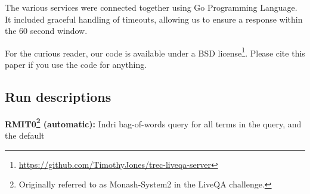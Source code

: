 \documentclass[a4paper,10pt,conference,compsocconf,final]{IEEEtran}
\begin{document}
The various services were connected together using Go Programming Language. It included graceful handling of timeouts, allowing us to ensure
a response within the 60 second window. 

For the curious reader, our code is
available under a BSD license\footnote{\url{https://github.com/TimothyJones/trec-liveqa-server}}. Please cite this paper if you use the code for anything.

\subsection{Run descriptions}
\label{sec:runs}

\noindent\textbf{RMIT0\footnote{Originally referred to as Monash-System2 in the LiveQA challenge.} (automatic): }
Indri bag-of-words query for all terms in the query, and the default
\end{document}
